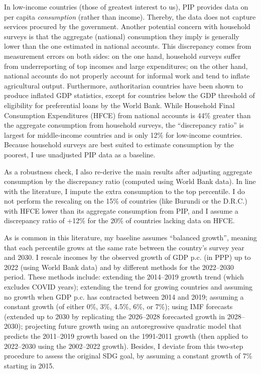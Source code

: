 In low-income countries (those of greatest interest to us), PIP provides data on per capita \textit{consumption} (rather than income). Thereby, the data does not capture services procured by the government. Another potential concern with household surveys is that the aggregate (national) consumption they imply is generally lower than the one estimated in national accounts.\cite{deaton_measuring_2005,prydz_disparities_2022} This discrepancy comes from measurement errors on both sides: on the one hand, household surveys suffer from underreporting of top incomes and large expenditures; on the other hand, national accounts do not properly account for informal work %
and tend to inflate agricultural output.\cite{angrist_why_2021} 
Furthermore, authoritarian countries have been shown to produce inflated GDP statistics, except for countries below the GDP threshold of eligibility for preferential loans by the World Bank.\cite{martinez_how_2022} %
While Household Final Consumption Expenditures (HFCE) from national accounts is 44\% greater than the aggregate consumption from household surveys, the ``discrepancy ratio'' is largest for middle-income countries and is only 12\% for low-income countries. 
Because household surveys are best suited to estimate consumption by the poorest, I use unadjusted PIP data as a baseline. 

As a robustness check, I also re-derive the main results after adjusting aggregate consumption by the discrepancy ratio (computed using World Bank data). In line with the literature,\cite{lakner_global_2013,anand_chapter_2015} I impute the extra consumption to the top percentile. I do not perform the rescaling on the 15\% of countries (like Burundi or the D.R.C.) with HFCE lower than its aggregate consumption from PIP, and I assume a discrepancy ratio of +12\% for the 20\% of countries lacking data on HFCE. 

As is common in this literature,\cite{karver_mdgs_2012,hellebrandt_future_2015,bicaba_can_2017} my baseline assumes ``balanced growth'', meaning that each percentile grows at the same rate between the country's survey year and 2030. 
I rescale incomes by the observed growth of GDP p.c. (in PPP) up to 2022 (using World Bank data) and by different methods for the 2022--2030 period. 
These methods include: extending the 2014--2019 growth trend (which excludes COVID years); extending the trend for growing countries and assuming no growth when GDP p.c. has contracted between 2014 and 2019; assuming a constant growth (of either 0\%, 3\%, 4.5\%, 6\%, or 7\%); using IMF forecasts\cite{imf_world_2023} (extended up to 2030 by replicating the 2026--2028 forecasted growth in 2028--2030); projecting future growth using an autoregressive quadratic model that predicts the 2011--2019 growth based on the 1991-2011 growth (then applied to 2022--2030 using the 2002--2022 growth). Besides, I deviate from this two-step procedure to assess the original SDG goal, by assuming a constant growth of 7\% starting in 2015.

